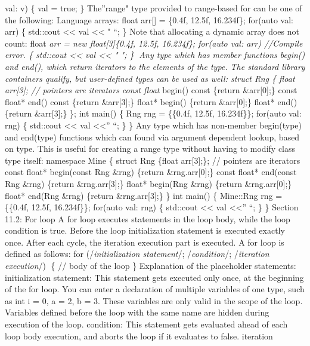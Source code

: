val: v) \{ val = true; \} The''range" type provided to range-based for
can be one of the following: Language arrays: float arr{[}{]} = \{0.4f,
12.5f, 16.234f\}; for(auto val: arr) \{ std::cout \textless\textless{}
val \textless\textless{} " ``; \} Note that allocating a dynamic array
does not count: float \emph{arr = new float{[}3{]}\{0.4f, 12.5f,
16.234f\}; for(auto val: arr) //Compile error. \{ std::cout
\textless\textless{} val \textless\textless{} " "; \} Any type which
has member functions begin() and end(), which return iterators to the
elements of the type. The standard library containers qualify, but
user-deﬁned types can be used as well: struct Rng \{ float arr{[}3{]};
// pointers are iterators const float} begin() const \{return
\&arr{[}0{]};\} const float* end() const \{return \&arr{[}3{]};\} float*
begin() \{return \&arr{[}0{]};\} float* end() \{return \&arr{[}3{]};\}
\}; int main() \{ Rng rng = \{\{0.4f, 12.5f, 16.234f\}\}; for(auto val:
rng) \{ std::cout \textless\textless{} val \textless\textless{}'' ``; \}
\} Any type which has non-member begin(type) and end(type) functions
which can found via argument dependent lookup, based on type. This is
useful for creating a range type without having to modify class type
itself: namespace Mine \{ struct Rng \{float arr{[}3{]};\}; // pointers
are iterators const float* begin(const Rng \&rng) \{return
\&rng.arr{[}0{]};\} const float* end(const Rng \&rng) \{return
\&rng.arr{[}3{]};\} float* begin(Rng \&rng) \{return \&rng.arr{[}0{]};\}
float* end(Rng \&rng) \{return \&rng.arr{[}3{]};\} \} int main() \{
Mine::Rng rng = \{\{0.4f, 12.5f, 16.234f\}\}; for(auto val: rng) \{
std::cout \textless\textless{} val \textless\textless{}'' ``; \} \}
Section 11.2: For loop A for loop executes statements in the loop body,
while the loop condition is true. Before the loop initialization
statement is executed exactly once. After each cycle, the iteration
execution part is executed. A for loop is deﬁned as follows: for
(/\emph{initialization statement}/; /\emph{condition}/; /\emph{iteration
execution}/) \{ // body of the loop \} Explanation of the placeholder
statements: initialization statement: This statement gets executed only
once, at the beginning of the for loop. You can enter a declaration of
multiple variables of one type, such as int i = 0, a = 2, b = 3. These
variables are only valid in the scope of the loop. Variables deﬁned
before the loop with the same name are hidden during execution of the
loop. condition: This statement gets evaluated ahead of each loop body
execution, and aborts the loop if it evaluates to false. iteration
